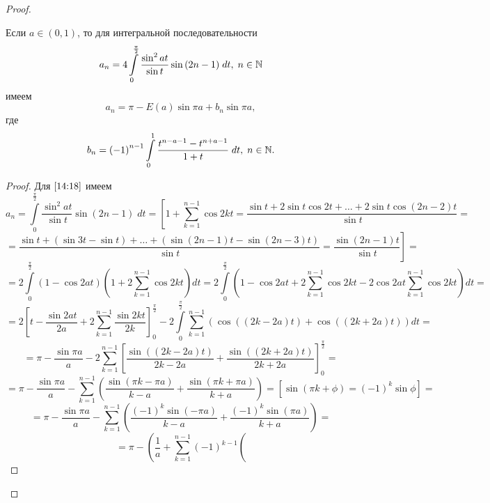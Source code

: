 \documentclass[../../main.tex]{subfiles}
\begin{document}
\begin{proof}
		\begin{lemma}
			Если $a \in (0,1)$, то для интегральной последовательности
			\begin{equation}
			\label{14:18}
			a_n = 4 \int\limits_{0}^{\frac{\pi}{2}} \frac{\sin^2{at}}{\sin{t}} 
			\sin{\left(2n-1 \right) } \; dt, \; n \in \mathbb{N}
			\end{equation}
			имеем
			\begin{equation}
			\label{14:19}
			a_n = \pi - E(a) \sin{\pi a} + b_n \sin{\pi a},
			\end{equation}
			где
			\begin{equation}
			\label{14:20}
			b_n = \left( - 1 \right)^{n-1} \int\limits_{0}^{1} \frac{t^{n-a-1} - 
			t^{n+a-1} }{1+t} \; dt, \; n \in \mathbb{N}.
			\end{equation}
		\end{lemma}	
			\begin{proof}
				Для $\eqref{14:18}$ имеем
				\[   a_n =  \int\limits_{0}^{\frac{\pi}{2}} \frac{\sin^2{at}}{\sin{t}} 
				\sin{\left(2n-1 \right) } \; dt = \left[ 1 + \sum^{n-1}_{k = 1} \cos{2k t} 
				= \frac{\sin{t} + 2 \sin{t} \cos{2t} + \dots + 2\sin{t} \cos{(2n - 
				2)t}}{\sin{t}} \right. = \]
				\[ = \left. \frac{\sin{t} + \left( \sin{3t} - \sin{t} \right) + \dots 
				+\left( \sin{(2n-1)t} - \sin{(2n-3)t} \right) }{\sin{t}} = 
				\frac{\sin{(2n-1)t}}{\sin{t}} \right] = \]
				\[ = 2 \int\limits_{0}^{\frac{\pi}{2}} \left( 1-\cos{2at}\right) \left( 1 
				+ 2 \sum^{n-1}_{k = 1} \cos{2k t} \right) dt  = 
				2\int\limits_{0}^{\frac{\pi}{2}} \left( 1-\cos{2at} + 2 \sum^{n-1}_{k = 1} 
				\cos{2k t} - 2 \cos{2at} \sum^{n-1}_{k = 1} \cos{2k t}\right) dt = \]
				\[  = 2 \left[ t - \frac{\sin{2at}}{2a} + 2 
				\sum_{k=1}^{n-1}\frac{\sin{2kt}}{2k} \right]_{0}^{\frac{\pi}{2}} - 2 
				\int\limits_{0}^{\frac{\pi}{2}} \sum_{k=1}^{n-1} \left( \cos((2k-2a)t) + 
				\cos((2k+2a)t) \right) dt = \]
				\[  = \pi - \frac{\sin{\pi a}}{a} - 2 \sum_{k=1}^{n-1} \left[ 
				\frac{\sin((2k-2a)t)}{2k-2a} + \frac{\sin((2k+2a)t)}{2k+2a} 
				\right]_{0}^{\frac{\pi}{2}} = \]
				\[    = \pi - \frac{\sin{\pi a}}{a} -  \sum_{k=1}^{n-1} \left( 
				\frac{\sin{(\pi k- \pi a)}}{k-a} + \frac{\sin{(\pi k+ \pi a)}}{k+a} 
				\right) = \left[ \sin{(\pi k + \phi) = \left( -1\right)^k \sin{\phi}} 
				\right] = \]
				\[  = \pi - \frac{\sin{\pi a}}{a} - \sum_{k=1}^{n-1} \left( \frac{(-1)^k 
				\sin{(- \pi a)}}{k-a} + \frac{(-1)^k \sin{(\pi a)}}{k+a} \right)  =        
				  \]
				\[ = \pi -\left(  \frac{1}{a} + \sum_{k=1}^{n-1} (-1)^{k-1} \left( 
\]
\end{proof}
\end{proof}
\end{document}

